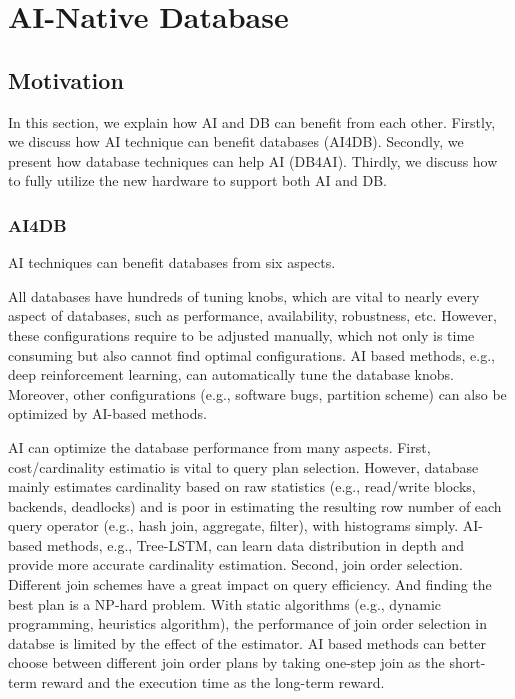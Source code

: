 
 
\section{AI-Native Database}
\label{sec:ANDB}
 
\subsection{Motivation}
\label{sec:motivation}
 

In this section, we explain how AI and DB can benefit from each other. Firstly, we discuss how AI technique can benefit databases (AI4DB). Secondly, we present how database techniques can help AI (DB4AI). Thirdly, we discuss how to fully utilize the new hardware to support both AI and DB. 


\subsubsection{AI4DB}
AI techniques can benefit databases from six aspects.

 All databases have hundreds of tuning knobs, which are vital to nearly every aspect of databases, such as performance, availability, robustness, etc. However, these configurations require to be adjusted manually, which not only is time consuming but also cannot find optimal configurations. AI based methods, e.g., deep reinforcement learning, can automatically tune the database knobs. Moreover, other configurations (e.g., software bugs, partition scheme) can also be optimized by AI-based methods. 


 AI can optimize the database performance from many aspects. First, cost/cardinality estimatio is vital to query plan selection. However, database mainly estimates cardinality based on raw statistics (e.g., read/write blocks, backends, deadlocks) and is poor in estimating the resulting row number of each query operator (e.g., hash join, aggregate, filter), with histograms simply. AI-based methods, e.g., Tree-LSTM, can learn data distribution in depth and provide more accurate cardinality estimation. Second, join order selection. Different join schemes have a great impact on query efficiency. And finding the best plan is a NP-hard problem. With static algorithms (e.g., dynamic programming, heuristics algorithm), the performance of join order selection in databse is limited by the effect of the estimator. AI based methods can better choose between different join order plans by taking one-step join as the short-term reward and the execution time as the long-term reward. 

